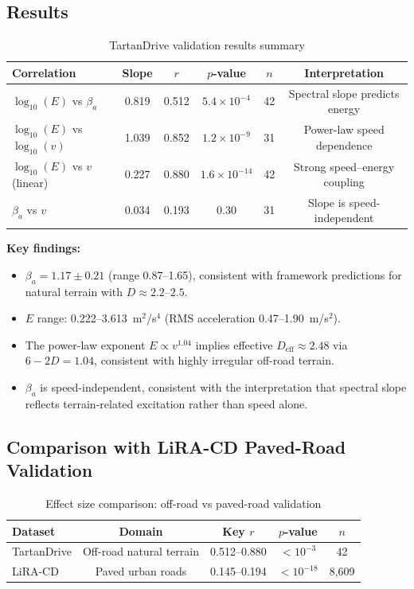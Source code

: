 \documentclass[11pt]{article}
\begin{document}
\subsection{Results}

\begin{table}[h]
\centering
\caption{TartanDrive validation results summary}
\begin{tabular}{lccccc}
\hline
Correlation & Slope & $r$ & $p$-value & $n$ & Interpretation \\
\hline
$\log_{10}(E)$ vs $\beta_a$ & 0.819 & 0.512 & $5.4 \times 10^{-4}$ & 42 & Spectral slope predicts energy \\
$\log_{10}(E)$ vs $\log_{10}(v)$ & 1.039 & 0.852 & $1.2 \times 10^{-9}$ & 31 & Power-law speed dependence \\
$\log_{10}(E)$ vs $v$ (linear) & 0.227 & 0.880 & $1.6 \times 10^{-14}$ & 42 & Strong speed--energy coupling \\
$\beta_a$ vs $v$ & 0.034 & 0.193 & 0.30 & 31 & Slope is speed-independent \\
\hline
\end{tabular}
\end{table}

\textbf{Key findings:}
\begin{itemize}
\item $\beta_a = 1.17 \pm 0.21$ (range 0.87--1.65), consistent with framework predictions for natural terrain with $D \approx 2.2$--$2.5$.
\item $E$ range: 0.222--3.613~m$^2$/s$^4$ (RMS acceleration 0.47--1.90~m/s$^2$).
\item The power-law exponent $E \propto v^{1.04}$ implies effective $D_{\mathrm{eff}} \approx 2.48$ via $6-2D = 1.04$, consistent with highly irregular off-road terrain.
\item $\beta_a$ is speed-independent, consistent with the interpretation that spectral slope reflects terrain-related excitation rather than speed alone.
\end{itemize}

\subsection{Comparison with LiRA-CD Paved-Road Validation}

\begin{table}[h]
\centering
\caption{Effect size comparison: off-road vs paved-road validation}
\begin{tabular}{lcccc}
\hline
Dataset & Domain & Key $r$ & $p$-value & $n$ \\
\hline
TartanDrive & Off-road natural terrain & 0.512--0.880 & $<10^{-3}$ & 42 \\
LiRA-CD & Paved urban roads & 0.145--0.194 & $<10^{-18}$ & 8,609 \\
\hline
\end{tabular}
\end{table}
\end{document}
